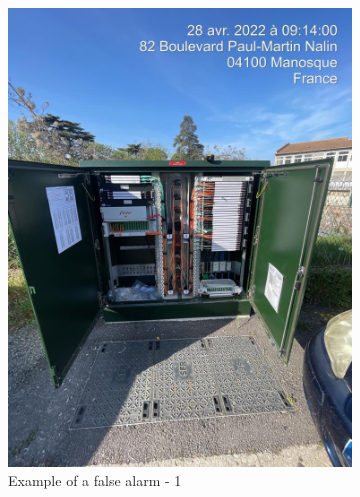 \begin{figure}[H]
    \centering
    \begin{subfigure}{0.4\textwidth}
        \includegraphics[width=\linewidth]{images/false_positif/f3_1.jpg}
        \caption{Example of a false alarm - 1}
    \end{subfigure}
    \begin{subfigure}{0.4\textwidth}

\end{subfigure}
\end{figure}
